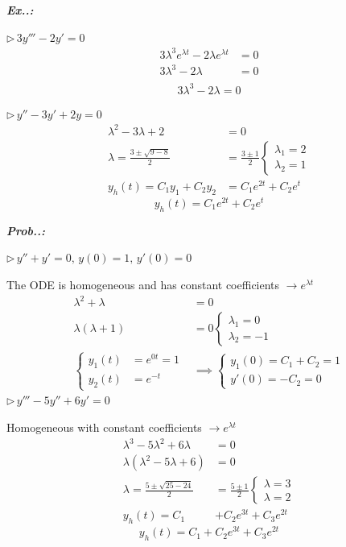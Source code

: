 \documentclass[a4paper]{article}
\begin{document}
\vspace{2ex}\textbf{\textit{Ex.\thesection.\theex: }}

$\triangleright\, 3y'''-2y'=0$
\begin{align}
3\lambda^{3}e^{ \lambda t }-2\lambda e^{ \lambda t }&=0 \\
3\lambda^{3}-2\lambda&=0 \\
\end{align}
$$
\boxed{3\lambda^{3}-2\lambda=0}
$$

$\triangleright\,y''-3y'+2y=0$
\begin{align} 
\lambda^{2}-3\lambda+2&=0 \\
\lambda=\frac{3\pm \sqrt{ 9-8 }}{2} &=\frac{3\pm1}{2}\begin{cases}
\lambda_{1}=2 \\
\lambda_{2}=1
\end{cases} \\
y_{h}(t)=C_{1}y_{1}+C_{2}y_{2}&=C_{1}e^{ 2t }+C_{2}e^{ t }
\end{align}
$$
\boxed{y_{h}(t)=C_{1}e^{ 2t }+C_{2}e^{ t }}
$$

\vspace{2ex}\textbf{\textit{Prob.\thesection.\theprob: }}

$\triangleright\, y''+y'=0,\,y(0)=1,\,y'(0)=0$

The ODE is homogeneous and has constant coefficients $\to e^{ \lambda t }$
\begin{align}
\lambda^{2}+\lambda&=0 \\
\lambda(\lambda+1)&=0\begin{cases}
\lambda_{1}=0 \\
\lambda_{2}=-1
\end{cases} \\
\begin{cases}
y_{1}(t)&=e^{ 0t }=1 \\
y_{2}(t)&=e^{ -t } 
\end{cases}&\implies \begin{cases}
y_{1}(0)=C_{1}+C_{2}=1 \\
y'(0)=-C_{2}=0
\end{cases}
\end{align}
$\triangleright\, y'''-5y''+6y'=0$

Homogeneous with constant coefficients $\to e^{ \lambda t }$
\begin{align}
\lambda^{3}-5\lambda^{2}+6\lambda&=0 \\
\lambda(\lambda^{2}-5\lambda+6)&=0 \\
\lambda=\frac{5\pm \sqrt{ 25-24 }}{2}&=\frac{5\pm1}{2}\begin{cases}
\lambda=3 \\
\lambda=2
\end{cases} \\
y_{h}(t)=C_{1}&+C_{2}e^{ 3t }+C_{3}e^{ 2t }
\end{align}
$$
\boxed{y_{h}(t)=C_{1}+C_{2}e^{ 3t }+C_{3}e^{ 2t }}
$$
\end{document}
